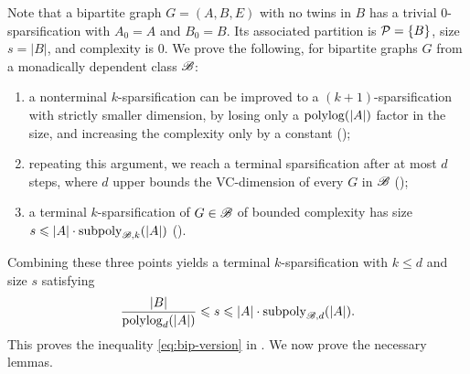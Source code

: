 Note that a bipartite graph $G=(A,B,E)$ with no twins in $B$ has a trivial $0$-sparsification with $A_0=A$ and $B_0=B$. Its associated partition is $\mathcal P=\{B\}$, size $s=|B|$, and complexity is $0$.
We prove the following, for bipartite graphs $G$ from a monadically dependent class ${\mathscr B}$:
\begin{enumerate}
  \item a nonterminal $k$-sparsification can be improved to a $(k+1)$-sparsification with strictly smaller dimension, by losing only a $\operatorname{polylog}(|A|)$ factor in the size, and increasing the complexity only by a constant ();
  \item repeating this argument, we reach a terminal sparsification after at most $d$ steps, where $d$ upper bounds the VC-dimension of every $G$ in ${\mathscr B}$ ();
  \item  a terminal $k$-sparsification of $G\in {\mathscr B}$ of bounded complexity has size $s\leqslant |A|\cdot \operatorname{subpoly}_{{\mathscr B},k}(|A|)$ ().
\end{enumerate}
Combining these three points yields a terminal $k$-sparsification with $k\le d$ and size $s$ satisfying
$$\frac{|B|}{\operatorname{polylog}_d(|A|)}\leqslant s\leqslant |A|\cdot\operatorname{subpoly}_{{\mathscr B},d}(|A|).$$
This proves the inequality \eqref{eq:bip-version} in . We now prove the necessary lemmas.



